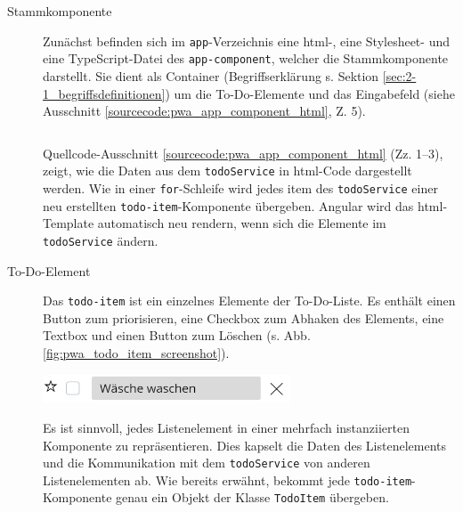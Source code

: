 \begin{description}
	\item[Stammkomponente] Zunächst befinden sich im \texttt{app}-Verzeichnis eine \ac{html}-, eine Stylesheet- und eine TypeScript-Datei des \texttt{app-component}, welcher die Stammkomponente darstellt. Sie dient als Container (Begriffserklärung s. Sektion \ref{sec:2-1_begriffsdefinitionen}) um die To-Do-Elemente und das Eingabefeld (siehe Ausschnitt \ref{sourcecode:pwa_app_component_html}, Z. 5).
	
	\begin{minipage}{\linewidth}
		\inputminted{ng2}{sourcecode/pwa_app_component.html}
		\vspace{-0.5cm}
		\label{sourcecode:pwa_app_component_html}
	\end{minipage}
	
	\vspace{0.5cm}
	Quellcode-Ausschnitt \ref{sourcecode:pwa_app_component_html} (Zz. 1--3), zeigt, wie die Daten aus dem \texttt{todoService} in \ac{html}-Code dargestellt werden. Wie in einer \texttt{for}-Schleife wird jedes item des \texttt{todoService} einer neu erstellten \texttt{todo-item}-Komponente übergeben.
	Angular wird das \ac{html}-Template automatisch neu rendern, wenn sich die Elemente im \texttt{todoService} ändern.	
	
	\item[To-Do-Element] 
	Das \texttt{todo-item} ist ein einzelnes Elemente der To-Do-Liste. Es enthält einen Button zum priorisieren, eine Checkbox zum Abhaken des Elements, eine Textbox und einen Button zum Löschen (s. Abb. \ref{fig:pwa_todo_item_screenshot}).
	\newpage
	\begin{minipage}{\linewidth}
		\includegraphics[width=0.6\textwidth]{img/pwa_todo_item.PNG}
		\centering
		\label{fig:pwa_todo_item_screenshot}
	\end{minipage}
	
	\vspace{0.5cm}
	Es ist sinnvoll, jedes Listenelement in einer mehrfach instanziierten Komponente zu repräsentieren. Dies kapselt die Daten des Listenelements und die Kommunikation mit dem \texttt{todoService} von anderen Listenelementen ab. Wie bereits erwähnt, bekommt jede \texttt{todo-item}-Komponente genau ein Objekt der Klasse \texttt{TodoItem} übergeben.
	

\end{description}
